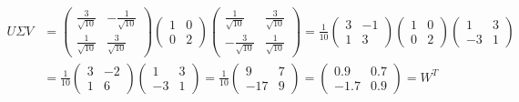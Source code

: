 \documentclass{article}
\begin{document}
        \begin{align*}
            U\Sigma V
            &=\begin{pmatrix}
                \frac{3}{\sqrt{10}} &-\frac{1}{\sqrt{10}}\\
                \frac{1}{\sqrt{10}} &\frac{3}{\sqrt{10}}
            \end{pmatrix}
            \begin{pmatrix}
                1 &0\\
                0 &2
            \end{pmatrix}
            \begin{pmatrix}
                \frac{1}{\sqrt{10}} &\frac{3}{\sqrt{10}}\\
                -\frac{3}{\sqrt{10}} &\frac{1}{\sqrt{10}}
            \end{pmatrix}=
            \frac{1}{10}\begin{pmatrix}
                3 &-1\\
                1 &3
            \end{pmatrix}\begin{pmatrix}
                1 &0\\
                0 &2
            \end{pmatrix}\begin{pmatrix}
                1 &3\\
                -3 &1
            \end{pmatrix}\\&=
            \frac{1}{10}\begin{pmatrix}
                3 &-2\\
                1 &6
            \end{pmatrix}\begin{pmatrix}
                1 &3\\
                -3 &1
            \end{pmatrix}
            =\frac{1}{10}\begin{pmatrix}
                9 &7\\
                -17 &9
            \end{pmatrix}
            =\begin{pmatrix}
                0.9 &0.7\\
                -1.7 &0.9
            \end{pmatrix}=W^T
        \end{align*}
\end{document}
